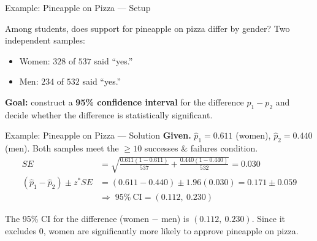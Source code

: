 \documentclass[aspectratio=169,11pt]{beamer}
\begin{document}
\begin{frame}{Example: Pineapple on Pizza --- Setup}
  \begin{keybox}[Scenario]
    Among students, does support for pineapple on pizza differ by gender?
    Two independent samples:
    \begin{itemize}
      \item Women: $328$ of $537$ said ``yes.''
      \item Men: $234$ of $532$ said ``yes.''
    \end{itemize}
  \end{keybox}
  \vspace{0.6em}
  \begin{center}
    \textbf{Goal:} construct a \textbf{95\% confidence interval} for the difference $p_1 - p_2$
    and decide whether the difference is statistically significant.
  \end{center}
\end{frame}

\begin{frame}{Example: Pineapple on Pizza --- Solution}
  \small
  \textbf{\color{qrnavy}Given.} $\hat{p}_1 = 0.611$ (women), $\hat{p}_2 = 0.440$ (men).
  Both samples meet the $\ge 10$ successes \& failures condition. \checkmark
  \begin{align*}
    SE &= \sqrt{\frac{0.611(1-0.611)}{537} + \frac{0.440(1-0.440)}{532}} = 0.030\\[0.3em]
    (\hat{p}_1 - \hat{p}_2) \pm z^{*} SE &= (0.611 - 0.440) \pm 1.96(0.030) = 0.171 \pm 0.059\\[0.2em]
    &\Rightarrow\; 95\%\ \text{CI} = (0.112,\ 0.230)
  \end{align*}
  \begin{tcolorbox}[colback=qrlight,colframe=qrnavy,arc=2pt,boxrule=0.6pt]
    \small The 95\% CI for the difference (women $-$ men) is $(0.112,\ 0.230)$.
    Since it excludes 0, women are significantly more likely to approve pineapple on pizza.
  \end{tcolorbox}
\end{frame}
\end{document}
